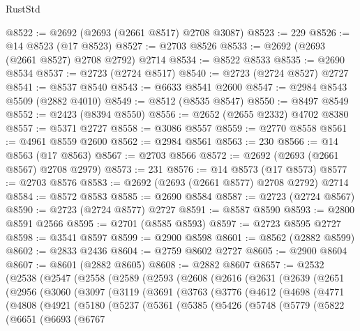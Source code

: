 \begin{lexlean}{RustStd}
\begin{coremodule}
@8522 := @2692 (@2693 (@2661 @8517) @2708 @3087)
@8523 := 229
@8526 := @14 @8523 (@17 @8523)
@8527 := @2703 @8526
@8533 := @2692 (@2693 (@2661 @8527) @2708 @2792) @2714
@8534 := @8522 @8533
@8535 := @2690 @8534
@8537 := @2723 (@2724 @8517)
@8540 := @2723 (@2724 @8527) @2727
@8541 := @8537 @8540
@8543 := @6633 @8541 @2600
@8547 := @2984 @8543 @5509 (@2882 @4010)
@8549 := @8512 (@8535 @8547)
@8550 := @8497 @8549
@8552 := @2423 (@8394 @8550)
@8556 := @2652 (@2655 @2332) @4702 @8380
@8557 := @5371 @2727
@8558 := @3086 @8557
@8559 := @2770 @8558
@8561 := @4961 @8559 @2600
@8562 := @2984 @8561
@8563 := 230
@8566 := @14 @8563 (@17 @8563)
@8567 := @2703 @8566
@8572 := @2692 (@2693 (@2661 @8567) @2708 @2979)
@8573 := 231
@8576 := @14 @8573 (@17 @8573)
@8577 := @2703 @8576
@8583 := @2692 (@2693 (@2661 @8577) @2708 @2792) @2714
@8584 := @8572 @8583
@8585 := @2690 @8584
@8587 := @2723 (@2724 @8567)
@8590 := @2723 (@2724 @8577) @2727
@8591 := @8587 @8590
@8593 := @2800 @8591 @2566
@8595 := @2701 (@8585 @8593)
@8597 := @2723 @8595 @2727
@8598 := @3541 @8597
@8599 := @2900 @8598
@8601 := @8562 (@2882 @8599)
@8602 := @2833 @2436
@8604 := @2759 @8602 @2727
@8605 := @2900 @8604
@8607 := @8601 (@2882 @8605)
@8608 := @2882 @8607
@8657 := @2532
    (@2538
      (@2547
        (@2558
          (@2589
            (@2593
              (@2608
                (@2616
                  (@2631
                    (@2639
                      (@2651
                        (@2956
                          (@3060
                            (@3097
                              (@3119
                                (@3691
                                  (@3763
                                    (@3776
                                      (@4612
                                        (@4698
                                          (@4771
                                            (@4808
                                              (@4921
                                                (@5180
                                                  (@5237
                                                    (@5361
                                                      (@5385
                                                        (@5426
                                                          (@5748
                                                            (@5779
                                                              (@5822
                                                                (@6651
                                                                  (@6693
                                                                    (@6767

\end{coremodule}
\end{lexlean}

